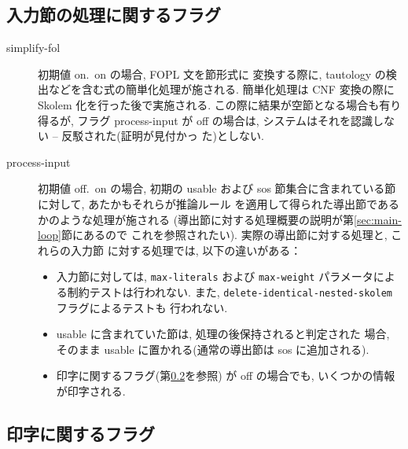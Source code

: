 \subsection{入力節の処理に関するフラグ}
\label{sec:input}
\begin{description}
\item[simplify-fol] 初期値 on.\ on の場合, FOPL 文を節形式に
  変換する際に, tautology の検出などを含む式の簡単化処理が施される.
  簡単化処理は CNF 変換の際に Skolem 化を行った後で実施される. 
  この際に結果が空節となる場合も有り得るが, フラグ process-input
  が off の場合は, システムはそれを認識しない -- 反駁された(証明が見付かっ
  た)としない.

\item[process-input] 初期値 off.\ on の場合, 初期の usable および
  sos 節集合に含まれている節に対して, あたかもそれらが推論ルール
  を適用して得られた導出節であるかのような処理が施される
  (導出節に対する処理概要の説明が第\ref{sec:main-loop}節にあるので
  これを参照されたい). 実際の導出節に対する処理と, これらの入力節
  に対する処理では, 以下の違いがある：
  \begin{itemize}
  \item[(1)] 入力節に対しては, \texttt{max-literals} および 
    \texttt{max-weight} パラメータによる制約テストは行われない.
    また, \texttt{delete-identical-nested-skolem} フラグによるテストも
    行われない.
  \item[(2)] usable に含まれていた節は, 処理の後保持されると判定された
    場合, そのまま usable に置かれる(通常の導出節は sos に追加される).

  \item[(3)] 印字に関するフラグ(第\ref{sec:output-flags}を参照)
    が off の場合でも, いくつかの情報が印字される.
  \end{itemize}

\end{description}

\subsection{印字に関するフラグ}
\label{sec:output-flags}

